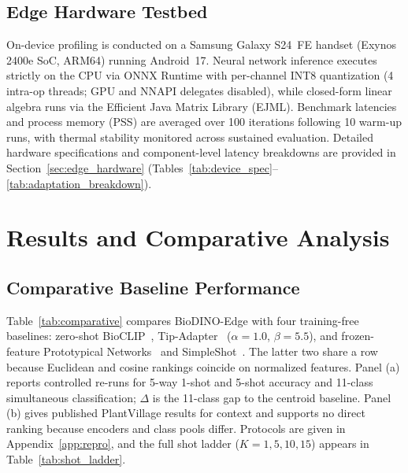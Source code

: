 \documentclass[preprint,12pt]{elsarticle}
\begin{document}
\subsection{Edge Hardware Testbed}
\label{sec:edge_hardware_testbed}
On-device profiling is conducted on a Samsung Galaxy S24~FE handset (Exynos 2400e SoC, ARM64) running Android~17. Neural network inference executes strictly on the CPU via ONNX Runtime with per-channel INT8 quantization (4 intra-op threads; GPU and NNAPI delegates disabled), while closed-form linear algebra runs via the Efficient Java Matrix Library (EJML). Benchmark latencies and process memory (PSS) are averaged over 100 iterations following 10 warm-up runs, with thermal stability monitored across sustained evaluation. Detailed hardware specifications and component-level latency breakdowns are provided in Section~\ref{sec:edge_hardware} (Tables~\ref{tab:device_spec}--\ref{tab:adaptation_breakdown}).

\section{Results and Comparative Analysis}
\label{sec:results}

\subsection{Comparative Baseline Performance}
\label{sec:comparative_results}
Table~\ref{tab:comparative} compares BioDINO-Edge with four training-free baselines: zero-shot BioCLIP~\cite{stevens2024bioclip}, Tip-Adapter~\cite{zhang2022tip} ($\alpha=1.0$, $\beta=5.5$), and frozen-feature Prototypical Networks~\cite{snell2017prototypical} and SimpleShot~\cite{wang2019simpleshot}. The latter two share a row because Euclidean and cosine rankings coincide on normalized features. Panel (a) reports controlled re-runs for 5-way 1-shot and 5-shot accuracy and 11-class simultaneous classification; $\Delta$ is the 11-class gap to the centroid baseline. Panel (b) gives published PlantVillage results for context and supports no direct ranking because encoders and class pools differ. Protocols are given in Appendix~\ref{app:repro}, and the full shot ladder ($K=1,5,10,15$) appears in Table~\ref{tab:shot_ladder}.
\end{document}
